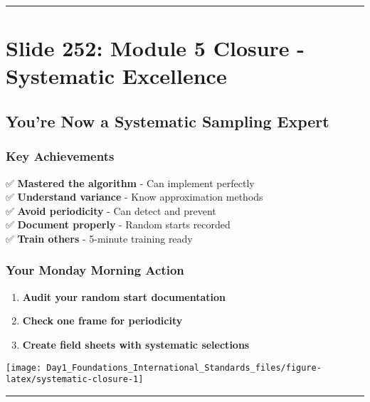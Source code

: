 \documentclass[
]{article}
\providecommand{\tightlist}{%
  \setlength{\itemsep}{0pt}\setlength{\parskip}{0pt}}
\begin{document}
\begin{center}\rule{0.5\linewidth}{0.5pt}\end{center}

\section{Slide 252: Module 5 Closure - Systematic
Excellence}\label{slide-252-module-5-closure---systematic-excellence}

\subsection{You're Now a Systematic Sampling
Expert}\label{youre-now-a-systematic-sampling-expert}

\subsubsection{Key Achievements}\label{key-achievements}

✅ \textbf{Mastered the algorithm} - Can implement perfectly\\
✅ \textbf{Understand variance} - Know approximation methods\\
✅ \textbf{Avoid periodicity} - Can detect and prevent\\
✅ \textbf{Document properly} - Random starts recorded\\
✅ \textbf{Train others} - 5-minute training ready

\subsubsection{Your Monday Morning
Action}\label{your-monday-morning-action}

\begin{enumerate}
\def\labelenumi{\arabic{enumi}.}
\tightlist
\item
  \textbf{Audit your random start documentation}
\item
  \textbf{Check one frame for periodicity}
\item
  \textbf{Create field sheets with systematic selections}
\end{enumerate}

\texttt{[image: Day1\_Foundations\_International\_Standards\_files/figure-latex/systematic-closure-1]}

\begin{center}\rule{0.5\linewidth}{0.5pt}\end{center}
\end{document}

